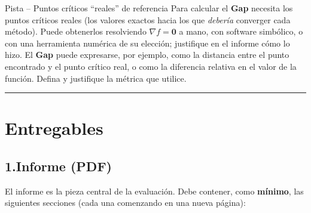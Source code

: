 \documentclass[12pt,a4paper]{article}
\begin{document}
\begin{ayuda}{Pista -- Puntos críticos ``reales'' de referencia}
\vspace{2pt}
Para calcular el \textbf{Gap} necesita los puntos críticos reales (los valores
exactos hacia los que \emph{debería} converger cada método). Puede obtenerlos
resolviendo $\nabla f = \mathbf{0}$ a mano, con software simbólico, o con una
herramienta numérica de su elección; justifique en el informe cómo lo hizo.
El \textbf{Gap} puede expresarse, por ejemplo, como la distancia entre el punto
encontrado y el punto crítico real, o como la diferencia relativa en el valor
de la función. Defina y justifique la métrica que utilice.
\end{ayuda}

\noindent\rule{\linewidth}{0.4pt}

\section*{Entregables}

\subsection*{1.\quad Informe (PDF)}

El informe es la pieza central de la evaluación. Debe contener, como
\textbf{mínimo}, las siguientes secciones (cada una comenzando en una nueva
página):
\end{document}

